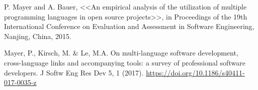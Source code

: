 \begingroup
\renewcommand{\section}[2]{\anonsection{Библиографический список}}
\begin{thebibliography}{00}

    P. Mayer and A. Bauer, 
    <<An empirical analysis of the utilization of multiple programming languages in open source projects>>, 
    in Proceedings of the 19th International Conference on Evaluation and Assessment in Software Engineering, 
    Nanjing, China, 2015.

Mayer, P., Kirsch, M. \& Le, M.A. On multi-language software development,
 cross-language links and accompanying tools: 
 a survey of professional software developers. 
 J Softw Eng Res Dev 5, 1 (2017). \url{https://doi.org/10.1186/s40411-017-0035-z}

\end{thebibliography}
\endgroup

\clearpage
